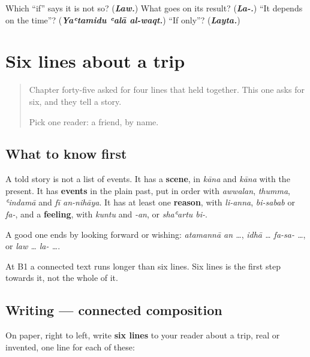 \begin{tcolorbox}[breakable,colback=teal!4,colframe=teal!35!black,title={Before you move on}]
Which \textquotedblleft{}if\textquotedblright{} says it is not so? (\emph{\textbf{Law.}}) What goes on its result? (\emph{\textbf{La-.}}) \textquotedblleft{}It depends on the time\textquotedblright{}? (\emph{\textbf{Yaʿtamidu ʿalā al-waqt.}}) \textquotedblleft{}If only\textquotedblright{}? (\emph{\textbf{Layta.}})
\end{tcolorbox}
\section[(six lines)]{Six lines about a trip}

\label{lesson:AR-W292-sitta-sutur}



\begin{quote}
Chapter forty-five asked for four lines that held together. This one asks for six, and they tell a story.

Pick one reader: a friend, by name.
\end{quote}

\subsection*{What to know first}
A told story is not a list of events. It has a \textbf{scene}, in \emph{kāna} and \emph{kāna} with the present. It has \textbf{events} in the plain past, put in order with \emph{awwalan}, \emph{thumma}, \emph{ʿindamā} and \emph{fī an-nihāya}. It has at least one \textbf{reason}, with \emph{li-anna}, \emph{bi-sabab} or \emph{fa-}, and a \textbf{feeling}, with \emph{kuntu} and \emph{-an}, or \emph{shaʿartu bi-}.

A good one ends by looking forward or wishing: \emph{atamannā an …}, \emph{idhā … fa-sa- …}, or \emph{law … la- …}.

At B1 a connected text runs longer than six lines. Six lines is the first step towards it, not the whole of it.

\subsection*{Writing — connected composition}
On paper, right to left, write \textbf{six lines} to your reader about a trip, real or invented, one line for each of these:

